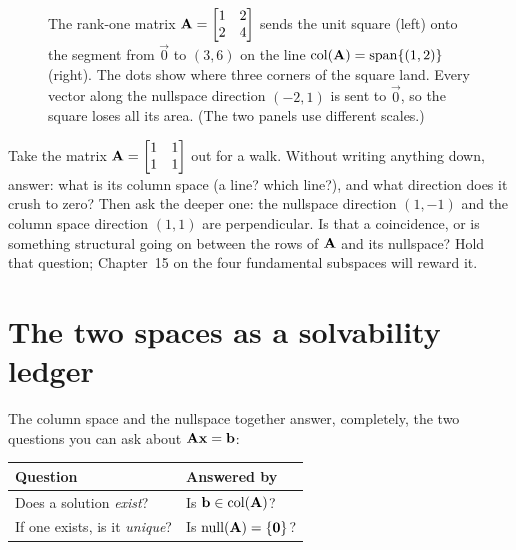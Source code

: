 \begin{figure}[htbp]
\caption{The rank-one matrix $\mathbf{A}=\protect\begin{bmatrix}1&2\\2&4\protect
\end{bmatrix}$ sends the unit square (left) onto the segment from $\vec{0}$ to
$(3,6)$ on the line $\operatorname{col}(\mathbf{A})=\operatorname{span}\{(1,2)\}$ (right). The dots show where
three corners of the square land. Every vector along the nullspace direction
$(-2,1)$ is sent to $\vec{0}$, so the square loses all its area. (The two panels
use different scales.)}
\label{ch12:fig-collapse}
\end{figure}

\begin{walkbox}
Take the matrix $\mathbf{A}=\begin{bmatrix}1&1\\1&1\end{bmatrix}$ out for a walk.
Without writing anything down, answer: what is its column space (a line? which
line?), and what direction does it crush to zero? Then ask the deeper one: the
nullspace direction $(1,-1)$ and the column space direction $(1,1)$ are
perpendicular. Is that a coincidence, or is something structural going on between
the rows of $\mathbf{A}$ and its nullspace? Hold that question; Chapter~15 on the
four fundamental subspaces will reward it.
\end{walkbox}

\section{The two spaces as a solvability ledger}

The column space and the nullspace
together answer, completely, the two questions you can ask about
$\mathbf{A}\mathbf{x}=\mathbf{b}$:

\begin{center}
\begin{tabular}{ll}
\toprule
\textbf{Question} & \textbf{Answered by} \\
\midrule
Does a solution \emph{exist}? & Is $\mathbf{b}\in\operatorname{col}(\mathbf{A})$? \\
If one exists, is it \emph{unique}? & Is $\operatorname{null}(\mathbf{A})=\{\mathbf{0}\}$? \\
\bottomrule
\end{tabular}
\end{center}

